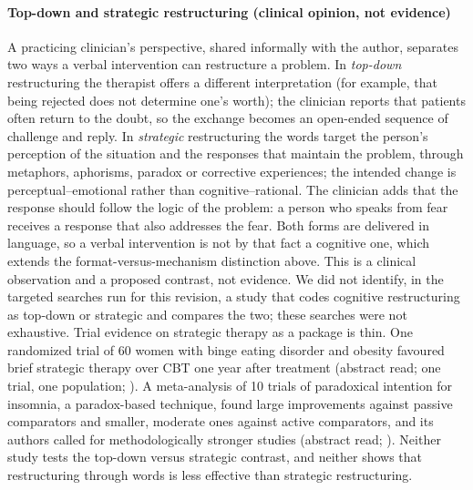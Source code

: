 \paragraph{Top-down and strategic restructuring (clinical opinion, not evidence)} A practicing clinician's perspective, shared informally with the author, separates two ways a verbal intervention can restructure a problem.
In \emph{top-down} restructuring the therapist offers a different interpretation (for example, that being rejected does not determine one's worth); the clinician reports that patients often return to the doubt, so the exchange becomes an open-ended sequence of challenge and reply.
In \emph{strategic} restructuring the words target the person's perception of the situation and the responses that maintain the problem, through metaphors, aphorisms, paradox or corrective experiences; the intended change is perceptual--emotional rather than cognitive--rational.
The clinician adds that the response should follow the logic of the problem: a person who speaks from fear receives a response that also addresses the fear.
Both forms are delivered in language, so a verbal intervention is not by that fact a cognitive one, which extends the format-versus-mechanism distinction above.
This is a clinical observation and a proposed contrast, not evidence.
We did not identify, in the targeted searches run for this revision, a study that codes cognitive restructuring as top-down or strategic and compares the two; these searches were not exhaustive.
Trial evidence on strategic therapy as a package is thin.
One randomized trial of 60 women with binge eating disorder and obesity favoured brief strategic therapy over CBT one year after treatment (abstract read; one trial, one population; \citealp{jackson2018bst}).
A meta-analysis of 10 trials of paradoxical intention for insomnia, a paradox-based technique, found large improvements against passive comparators and smaller, moderate ones against active comparators, and its authors called for methodologically stronger studies (abstract read; \citealp{janssonfrojmark2022paradoxical}).
Neither study tests the top-down versus strategic contrast, and neither shows that restructuring through words is less effective than strategic restructuring.

